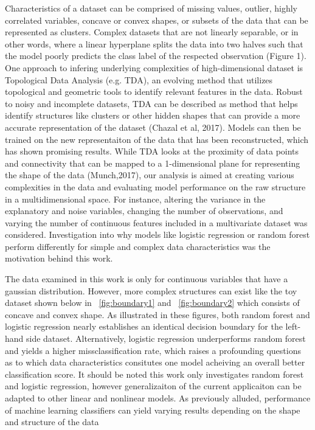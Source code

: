 \documentclass{llncs}
\begin{document}
Characteristics of a dataset can be comprised of missing values, outlier, highly correlated variables, concave or convex shapes, or subsets of the data that can be represented as clusters. Complex datasets that are not linearly separable, or in other words, where a linear hyperplane splits the data into two halves such that the model poorly predicts the class label of the respected observation (Figure 1). One approach to infering underlying complexities of high-dimensional dataset is Topological Data Analysis (e.g. TDA), an evolving method that utilizes topological and geometric tools to identify relevant features in the data. Robust to noisy and incomplete datasets, TDA can be described as method that helps identify structures like clusters or other hidden shapes that can provide a more accurate representation of the dataset (Chazal et al, 2017). Models can then be trained on the new representaiton of the data that has been reconstructed, which has shown promising results. While TDA looks at the proximity of data points and connectivity that can be mapped to a 1-dimensional plane for representing the shape of the data (Munch,2017), our analysis is aimed at creating various complexities in the data and evaluating model performance on the raw structure in a multidimensional space. For instance, altering the variance in the explanatory and noise variables, changing the number of observations, and varying the number of continuous features included in a multivariate dataset was considered. Investigation into why models like logistic regression or random forest perform differently for simple and complex data characteristics was the motivation behind this work.


The data examined in this work is only for continuous variables that have a gaussian distribution. However, more complex structures can exist like the toy dataset shown below in ~\ref{fig:boundary1} and ~\ref{fig:boundary2} which consists of concave and convex shape. As illustrated in these figures, both random forest and logistic regression nearly establishes an identical decision boundary for the left-hand side dataset. Alternatively, logistic regression underperforms random forest and yields a higher missclassification rate, which raises a profounding questions as to which data characteristics consitutes one model acheiving an overall better classification score. It should be noted this work only investigates random forest and logistic regression, however generalizaiton of the current applicaiton can be adapted to other linear and nonlinear models. As previously alluded, performance of machine learning classifiers can yield varying results depending on the shape and structure of the data
\end{document}
